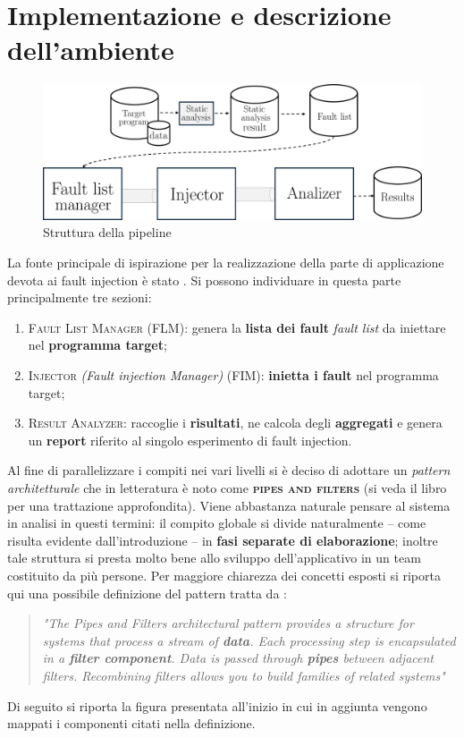 \section{Implementazione e descrizione dell'ambiente}\label{sec:Fault_Env}

\begin{figure}[h]
    \centering
    \includegraphics[scale=0.5]{img/pipeline.png}
    \caption{Struttura della pipeline}
\end{figure}

La fonte principale di ispirazione per la realizzazione della parte di applicazione devota ai fault injection è stato \cite{benso_fault_1998}.
Si possono individuare in questa parte principalmente tre sezioni: 
\begin{enumerate}
    \itemsep-0.3em
    \item \textsc{Fault List Manager} (FLM): genera la \textbf{lista dei fault} \textit{fault list} da iniettare nel \textbf{programma target}; 
    \item \textsc{Injector} \textit{(Fault injection Manager)} (FIM): \textbf{inietta i fault} nel programma target; 
    \item \textsc{Result Analyzer}: raccoglie i \textbf{risultati}, ne calcola degli \textbf{aggregati} e genera un \textbf{report} riferito al singolo esperimento di fault injection.
\end{enumerate}

Al fine di parallelizzare i compiti nei vari livelli si è deciso di adottare un \textit{pattern architetturale} che in letteratura è noto come \textbf{\textsc{pipes and filters}} (si veda il libro \cite{schmidt2013pattern} per una trattazione approfondita). Viene abbastanza naturale pensare al sistema in analisi in questi termini: il compito globale si divide naturalmente -- come risulta evidente dall'introduzione -- in \textbf{fasi separate di elaborazione}; inoltre tale struttura si presta molto bene allo sviluppo dell'applicativo in un team costituito da più persone. Per maggiore chiarezza dei concetti esposti si riporta qui una possibile definizione del pattern tratta da \cite{schmidt2013pattern}: 
\begin{quotation}
    \textit{
        \noindent
"The Pipes and Filters architectural pattern provides a structure for
systems that process a stream of \textbf{data}. Each processing step is
encapsulated in a \textbf{filter component}. Data is passed through \textbf{pipes}
between adjacent filters. Recombining filters allows you to build
families of related systems"}
\end{quotation}
Di seguito si riporta la figura presentata all'inizio in cui in aggiunta vengono mappati i componenti citati nella definizione. 

